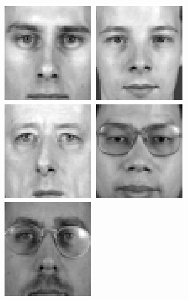 \begin{figure}[ht]
\begin{center}
\includegraphics[scale=0.12]{ch4/figures/XM2VTS_11.png}
\includegraphics[scale=0.12]{ch4/figures/XM2VTS_12.png}
\includegraphics[scale=0.12]{ch4/figures/XM2VTS_13.png}
\includegraphics[scale=0.12]{ch4/figures/XM2VTS_14.png}
\includegraphics[scale=0.12]{ch4/figures/XM2VTS_15.png}

\end{center}
\end{figure}
